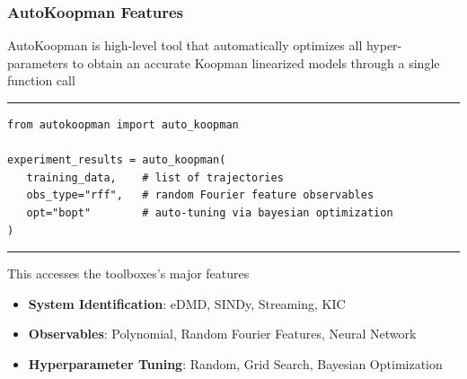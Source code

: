 \documentclass[shortpres,aspectratio=43]{beamer}
\begin{document}
\begin{frame}[fragile]
\frametitle{AutoKoopman Features}

AutoKoopman is high-level tool that automatically optimizes all hyper-parameters to obtain an accurate Koopman linearized models through a single function call
\rule{\textwidth}{1pt}
\begin{scriptsize}
\begin{verbatim}
from autokoopman import auto_koopman

experiment_results = auto_koopman(
   training_data,    # list of trajectories
   obs_type="rff",   # random Fourier feature observables
   opt="bopt"        # auto-tuning via bayesian optimization
)      
\end{verbatim}
\end{scriptsize}
\rule{\textwidth}{1pt}

This accesses the toolboxes's major features
\begin{itemize}
	\item \textbf{System Identification}: eDMD, SINDy, Streaming, KIC
	\item \textbf{Observables}: Polynomial, Random Fourier Features, Neural Network
	\item \textbf{Hyperparameter Tuning}: Random, Grid Search, Bayesian Optimization
\end{itemize}

\end{frame}
\end{document}
